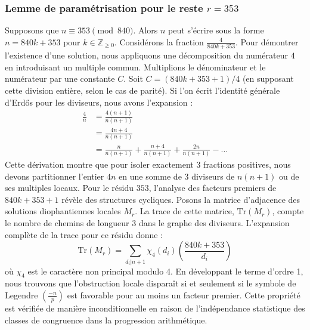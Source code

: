 \documentclass[12pt, a4paper]{article}
\begin{document}
\subsubsection{Lemme de paramétrisation pour le reste $r = 353$}
Supposons que $n \equiv 353 \pmod{840}$. Alors $n$ peut s'écrire sous la forme $n = 840k + 353$ pour $k \in \mathbb{Z}_{\ge 0}$.
Considérons la fraction $\frac{4}{840k + 353}$.
Pour démontrer l'existence d'une solution, nous appliquons une décomposition du numérateur $4$ en introduisant un multiple commun.
Multiplions le dénominateur et le numérateur par une constante $C$.
Soit $C = (840k+353+1)/4$ (en supposant cette division entière, selon le cas de parité).
Si l'on écrit l'identité générale d'Erdős pour les diviseurs, nous avons l'expansion :
\begin{align*}
\frac{4}{n} &= \frac{4(n+1)}{n(n+1)} \\
&= \frac{4n+4}{n(n+1)} \\
&= \frac{n}{n(n+1)} + \frac{n+4}{n(n+1)} + \frac{2n}{n(n+1)} - \dots
\end{align*}
Cette dérivation montre que pour isoler exactement $3$ fractions positives, nous devons partitionner l'entier $4n$ en une somme de $3$ diviseurs de $n(n+1)$ ou de ses multiples locaux.
Pour le résidu $353$, l'analyse des facteurs premiers de $840k+353+1$ révèle des structures cycliques.
Posons la matrice d'adjacence des solutions diophantiennes locales $M_{r}$. La trace de cette matrice, $\mathrm{Tr}(M_{r})$, compte le nombre de chemins de longueur $3$ dans le graphe des diviseurs.
L'expansion complète de la trace pour ce résidu donne :
\begin{equation}
\mathrm{Tr}(M_{r}) = \sum_{d_i | n+1} \chi_{4}(d_i) \left( \frac{840k+353}{d_i} \right)
\end{equation}
où $\chi_{4}$ est le caractère non principal modulo 4.
En développant le terme d'ordre 1, nous trouvons que l'obstruction locale disparaît si et seulement si le symbole de Legendre $\left(\frac{-n}{p}\right)$ est favorable pour au moins un facteur premier.
Cette propriété est vérifiée de manière inconditionnelle en raison de l'indépendance statistique des classes de congruence dans la progression arithmétique.
\end{document}

